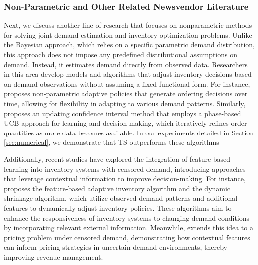 
% 
\subsubsection{Non-Parametric and Other Related Newsvendor Literature}
Next, we discuss another line of research that focuses on nonparametric methods for solving joint demand estimation and inventory optimization problems. Unlike the Bayesian approach, which relies on a specific parametric demand distribution, this approach does not impose any predefined distributional assumptions on demand. Instead, it estimates demand directly from observed data. Researchers in this area develop models and algorithms that adjust inventory decisions based on demand observations without assuming a fixed functional form. For instance, \cite{huh2009nonparametric} proposes non-parametric adaptive policies that generate ordering decisions over time, allowing for flexibility in adapting to various demand patterns. Similarly, \cite{agrawal2019learning} proposes an updating confidence interval method that employs a phase-based UCB approach for learning and decision-making, which iteratively refines order quantities as more data becomes available. In our experiments detailed in Section \ref{sec:numerical}, we demonstrate that TS outperforms these algorithms %

Additionally, recent studies have explored the integration of feature-based learning into inventory systems with censored demand, introducing approaches that leverage contextual information to improve decision-making. For instance, \cite{ding2024feature} proposes the feature-based adaptive inventory algorithm and the dynamic shrinkage algorithm, which utilize observed demand patterns and additional features to dynamically adjust inventory policies. These algorithms aim to enhance the responsiveness of inventory systems to changing demand conditions by incorporating relevant external information. Meanwhile, \cite{tang2025offline} extends this idea to a pricing problem under censored demand, demonstrating how contextual features can inform pricing strategies in uncertain demand environments, thereby improving revenue management.




